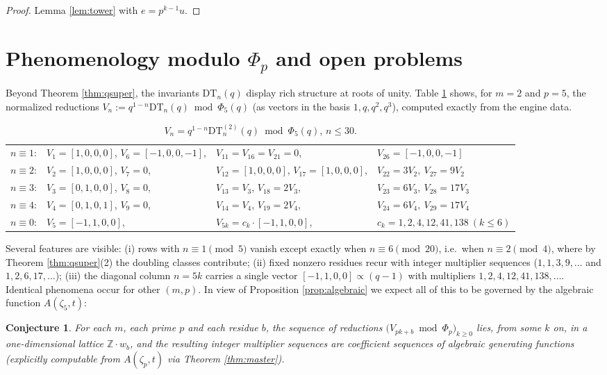 \documentclass[11pt]{amsart}
\newtheorem{conjecture}[theorem]{Conjecture}
\theoremstyle{definition}
\newcommand{\ZZ}{\mathbb{Z}}
\newcommand{\DT}{\mathrm{DT}}
\begin{document}
\begin{proof}
Lemma \ref{lem:tower} with $e=p^{k-1}u$.
\end{proof}

\section{Phenomenology modulo $\Phi_p$ and open problems}\label{sec:pheno}

Beyond Theorem \ref{thm:qsuper}, the invariants $\DT_n(q)$ display rich structure at roots of unity. Table \ref{tab:mod5} shows, for $m=2$ and $p=5$, the normalized reductions $V_n:=q^{1-n}\DT_n(q) \bmod \Phi_5(q)$ (as vectors in the basis $1,q,q^2,q^3$), computed exactly from the engine data.

\begin{table}[ht]
\caption{$V_n=q^{1-n}\DT^{(2)}_n(q)\bmod\Phi_5(q)$, $n\le30$.}\label{tab:mod5}
\begin{tabular}{llll}
$n\equiv1$: & $V_1=[1,0,0,0]$, $V_6=[-1,0,0,-1]$, & $V_{11}=V_{16}=V_{21}=0$, & $V_{26}=[-1,0,0,-1]$\\
$n\equiv2$: & $V_2=[1,0,0,0]$, $V_7=0$, & $V_{12}=[1,0,0,0]$, $V_{17}=[1,0,0,0]$, & $V_{22}=3V_2,\ V_{27}=9V_2$\\
$n\equiv3$: & $V_3=[0,1,0,0]$, $V_8=0$, & $V_{13}=V_3$, $V_{18}=2V_3$, & $V_{23}=6V_3,\ V_{28}=17V_3$\\
$n\equiv4$: & $V_4=[0,1,0,1]$, $V_9=0$, & $V_{14}=V_4$, $V_{19}=2V_4$, & $V_{24}=6V_4,\ V_{29}=17V_4$\\
$n\equiv0$: & $V_5=[-1,1,0,0]$, & $V_{5k}=c_k\cdot[-1,1,0,0]$, & $c_k=1,2,4,12,41,138\ (k\le6)$
\end{tabular}
\end{table}

Several features are visible: (i) rows with $n\equiv1\pmod 5$ vanish except exactly when $n\equiv6\pmod{20}$, i.e.\ when $n\equiv2\pmod4$, where by Theorem \ref{thm:qsuper}(2) the doubling classes contribute; (ii) fixed nonzero residues recur with integer multiplier sequences ($1,1,3,9,\dots$ and $1,2,6,17,\dots$); (iii) the diagonal column $n=5k$ carries a single vector $[-1,1,0,0]\propto(q-1)$ with multipliers $1,2,4,12,41,138,\dots$. Identical phenomena occur for other $(m,p)$. In view of Proposition \ref{prop:algebraic} we expect all of this to be governed by the algebraic function $A(\zeta_5,t)$:

\begin{conjecture}\label{conj:mult}
For each $m$, each prime $p$ and each residue $b$, the sequence of reductions $\big(V_{pk+b}\bmod\Phi_p\big)_{k\ge0}$ lies, from some $k$ on, in a one-dimensional lattice $\ZZ\cdot w_b$, and the resulting integer multiplier sequences are coefficient sequences of algebraic generating functions (explicitly computable from $A(\zeta_p,t)$ via Theorem \ref{thm:master}).
\end{conjecture}
\end{document}
